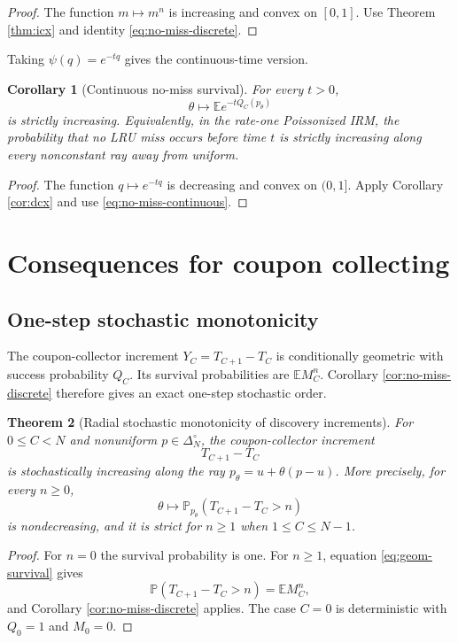\documentclass[11pt]{article}
\newtheorem{theorem}{Theorem}[section]
\newtheorem{corollary}[theorem]{Corollary}
\newcommand{\E}{\mathbb E}
\newcommand{\Pbb}{\mathbb P}
\newcommand{\1}{\mathbf 1}
\begin{document}
\begin{proof}
The function $m\mapsto m^n$ is increasing and convex on $[0,1]$.  Use
Theorem \ref{thm:icx} and identity \eqref{eq:no-miss-discrete}.
\end{proof}

Taking $\psi(q)=e^{-tq}$ gives the continuous-time version.

\begin{corollary}[Continuous no-miss survival]\label{cor:no-miss-continuous}
For every $t>0$,
\[
        \theta\mapsto \E e^{-tQ_C(p_\theta)}
\]
is strictly increasing.  Equivalently, in the rate-one Poissonized IRM, the probability
that no LRU miss occurs before time $t$ is strictly increasing along every nonconstant ray
away from uniform.
\end{corollary}

\begin{proof}
The function $q\mapsto e^{-tq}$ is decreasing and convex on $(0,1]$.  Apply
Corollary \ref{cor:dcx} and use \eqref{eq:no-miss-continuous}.
\end{proof}

\section{Consequences for coupon collecting}

\subsection{One-step stochastic monotonicity}

The coupon-collector increment $Y_C=T_{C+1}-T_C$ is conditionally geometric with success
probability $Q_C$.  Its survival probabilities are $\E M_C^n$.  Corollary
\ref{cor:no-miss-discrete} therefore gives an exact one-step stochastic order.

\begin{theorem}[Radial stochastic monotonicity of discovery increments]\label{thm:increment-stochastic}
For $0\le C<N$ and nonuniform $p\in\Delta_N^\circ$, the coupon-collector increment
\[
        T_{C+1}-T_C
\]
is stochastically increasing along the ray $p_\theta=u+\theta(p-u)$.  More precisely,
for every $n\ge0$,
\[
        \theta\mapsto \Pbb_{p_\theta}(T_{C+1}-T_C>n)
\]
is nondecreasing, and it is strict for $n\ge1$ when $1\le C\le N-1$.
\end{theorem}

\begin{proof}
For $n=0$ the survival probability is one.  For $n\ge1$, equation
\eqref{eq:geom-survival} gives
\[
        \Pbb(T_{C+1}-T_C>n)=\E M_C^n,
\]
and Corollary \ref{cor:no-miss-discrete} applies.  The case $C=0$ is deterministic with
$Q_0=1$ and $M_0=0$.
\end{proof}
\end{document}
